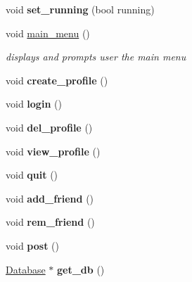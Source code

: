 \begin{DoxyCompactItemize}
\item 
\hypertarget{classfb_1_1_face_booklet_a5c91a678c4bfeedb43c6ae27893d7109}{void {\bfseries set\+\_\+running} (bool running)}\label{classfb_1_1_face_booklet_a5c91a678c4bfeedb43c6ae27893d7109}

\item 
\hypertarget{classfb_1_1_face_booklet_ab733b267b9ca4e94fa238f6ae1de2158}{void \hyperlink{classfb_1_1_face_booklet_ab733b267b9ca4e94fa238f6ae1de2158}{main\+\_\+menu} ()}\label{classfb_1_1_face_booklet_ab733b267b9ca4e94fa238f6ae1de2158}

\begin{DoxyCompactList}\small\item\em displays and prompts user the main menu \end{DoxyCompactList}\item 
\hypertarget{classfb_1_1_face_booklet_aa16728daa1895c288cbb4926e7e74959}{void {\bfseries create\+\_\+profile} ()}\label{classfb_1_1_face_booklet_aa16728daa1895c288cbb4926e7e74959}

\item 
\hypertarget{classfb_1_1_face_booklet_a7a38d051bdb1ca9b5f26967cdf18b174}{void {\bfseries login} ()}\label{classfb_1_1_face_booklet_a7a38d051bdb1ca9b5f26967cdf18b174}

\item 
\hypertarget{classfb_1_1_face_booklet_ae12aab1ff53969e206b7e474ce62119f}{void {\bfseries del\+\_\+profile} ()}\label{classfb_1_1_face_booklet_ae12aab1ff53969e206b7e474ce62119f}

\item 
\hypertarget{classfb_1_1_face_booklet_a11a3d4ba10ee2d790d8b3b574ba215ec}{void {\bfseries view\+\_\+profile} ()}\label{classfb_1_1_face_booklet_a11a3d4ba10ee2d790d8b3b574ba215ec}

\item 
\hypertarget{classfb_1_1_face_booklet_a8cb32d2fbbccacef5eb924a43cc9ec26}{void {\bfseries quit} ()}\label{classfb_1_1_face_booklet_a8cb32d2fbbccacef5eb924a43cc9ec26}

\item 
\hypertarget{classfb_1_1_face_booklet_adee1a8006f9a31ed2262943ab3438c64}{void {\bfseries add\+\_\+friend} ()}\label{classfb_1_1_face_booklet_adee1a8006f9a31ed2262943ab3438c64}

\item 
\hypertarget{classfb_1_1_face_booklet_ac1be20358a7f1ec696ead0ac1b18a86d}{void {\bfseries rem\+\_\+friend} ()}\label{classfb_1_1_face_booklet_ac1be20358a7f1ec696ead0ac1b18a86d}

\item 
\hypertarget{classfb_1_1_face_booklet_a17850270fa7f2ee8f2a114d9eddc4856}{void {\bfseries post} ()}\label{classfb_1_1_face_booklet_a17850270fa7f2ee8f2a114d9eddc4856}

\item 
\hypertarget{classfb_1_1_face_booklet_a6b3a509c9015dc3c18cf11906a6f31e6}{\hyperlink{classfb_1_1_database}{Database} $\ast$ {\bfseries get\+\_\+db} ()}\label{classfb_1_1_face_booklet_a6b3a509c9015dc3c18cf11906a6f31e6}

\end{DoxyCompactItemize}


